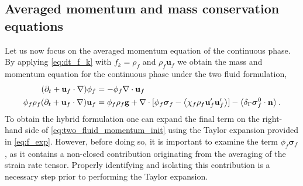







\subsection{Averaged momentum and mass conservation equations}



Let us now focus on the averaged momentum equation of the continuous phase. 
By applying \eqref{eq:dt_f_k} with $f_k = \rho_f$ and $\rho_f\textbf{u}_f$ we obtain the mass and momentum equation for the continuous phase under the two fluid formulation, 
\begin{align}
    (\pddt + \textbf{u}_f\cdot \grad)\phi_f&=-\phi_f \div \textbf{u}_f
    \label{eq:mass_init}\\
    \phi_f \rho_f(\pddt + \textbf{u}_f  \cdot \grad) \textbf{u}_f
    &= 
    \phi_f \rho_f \textbf{g}
    + \div [\phi_f \bm\sigma_f-  \avg{\chi_f\rho_f \textbf{u}_f'\textbf{u}_f'}]
    - \avg{\delta_\Gamma \bm\sigma_f^0\cdot \textbf{n}}.
    \label{eq:two_fluid_momentum_init}
\end{align} 
To obtain the hybrid formulation one can expand the final term on the right-hand side of \ref{eq:two_fluid_momentum_init} using the Taylor expansion provided in \ref{eq:f_exp}.  
However, before doing so, it is important to examine the term \( \phi_f \bm\sigma_f \), as it contains a non-closed contribution originating from the averaging of the strain rate tensor. %
Properly identifying and isolating this contribution is a necessary step prior to performing the Taylor expansion.


